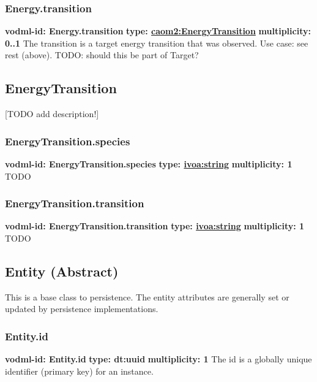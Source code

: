     \subsubsection{Energy.transition}
      \textbf{vodml-id: Energy.transition} \newline
      \textbf{type: \hyperref[sect:EnergyTransition]{caom2:EnergyTransition}} \newline
      \textbf{multiplicity: 0..1} \newline
      The transition is a target energy transition that was observed. Use case: see rest (above). TODO: should this be part of Target?

  \subsection{EnergyTransition}
  \label{sect:EnergyTransition}
    [TODO add description!]

    \subsubsection{EnergyTransition.species}
      \textbf{vodml-id: EnergyTransition.species} \newline
      \textbf{type: \hyperref[sect:ivoa]{ivoa:string}} \newline
      \textbf{multiplicity: 1} \newline
      TODO

    \subsubsection{EnergyTransition.transition}
      \textbf{vodml-id: EnergyTransition.transition} \newline
      \textbf{type: \hyperref[sect:ivoa]{ivoa:string}} \newline
      \textbf{multiplicity: 1} \newline
      TODO

  \subsection{Entity (Abstract)}
  \label{sect:Entity}
    This is a base class to persistence. The entity attributes are generally set or updated by persistence implementations.

    \subsubsection{Entity.id}
      \textbf{vodml-id: Entity.id} \newline
      \textbf{type: dt:uuid} \newline
      \textbf{multiplicity: 1} \newline
      The id is a globally unique identifier (primary key) for an instance.

